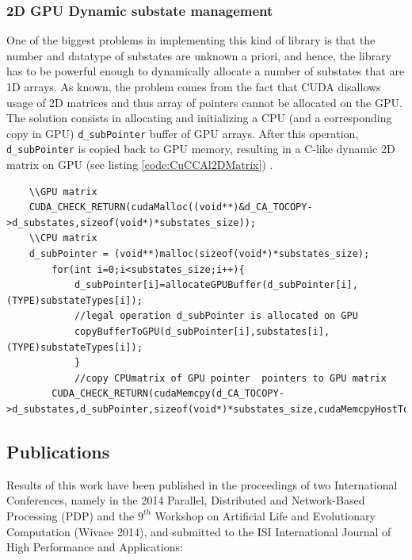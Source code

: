 \subsubsection{2D GPU Dynamic substate management}
One of the biggest problems in implementing this kind of library is that the number
and datatype of substates are unknown a priori, and hence, the library has to be
powerful enough to dynamically allocate a number of substates that are 1D arrays.
As known, the problem comes from the fact that CUDA disallows usage of 2D matrices and thus array
of pointers cannot be allocated on the GPU. 
The solution consists in allocating and initializing a CPU (and a corresponding copy in GPU) \texttt{d\_subPointer} buffer of GPU arrays.
After this operation,  \texttt{d\_subPointer} is copied back to GPU memory, resulting in 
a C-like dynamic 2D matrix on GPU (see listing \ref{code:CuCCAl2DMatrix}) .

\begin{lstlisting}
	\\GPU matrix
	CUDA_CHECK_RETURN(cudaMalloc((void**)&d_CA_TOCOPY->d_substates,sizeof(void*)*substates_size));
	\\CPU matrix	
	d_subPointer = (void**)malloc(sizeof(void*)*substates_size);
		for(int i=0;i<substates_size;i++){
			d_subPointer[i]=allocateGPUBuffer(d_subPointer[i],(TYPE)substateTypes[i]);
			//legal operation d_subPointer is allocated on GPU
			copyBufferToGPU(d_subPointer[i],substates[i],(TYPE)substateTypes[i]);
			}
			//copy CPUmatrix of GPU pointer  pointers to GPU matrix
		CUDA_CHECK_RETURN(cudaMemcpy(d_CA_TOCOPY->d_substates,d_subPointer,sizeof(void*)*substates_size,cudaMemcpyHostToDevice));
\end{lstlisting} 
 
 
\newpage

\subsection{Publications}

Results of this work have been published in the proceedings of two International
Conferences, namely in the 2014 Parallel, Distributed and Network-Based
Processing (PDP) and the \(9^{th}\) Workshop on Artificial Life and Evolutionary
Computation (Wivace 2014), and submitted to the ISI International Journal of
High Performance and Applications:
  
